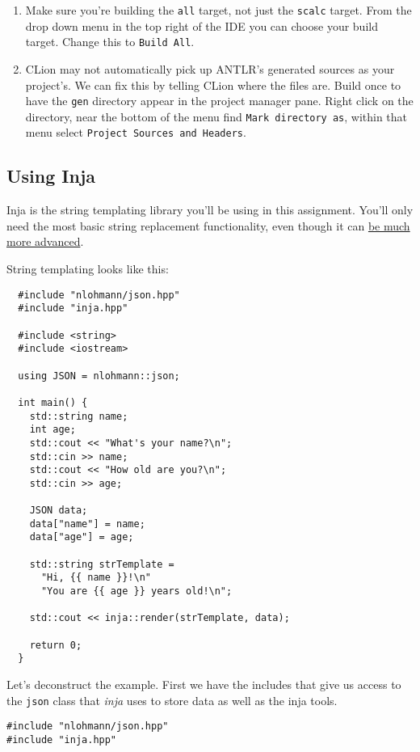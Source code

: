 \documentclass{article}
\newcommand{\code}[1]{\texttt{\textmd{#1}}}
\begin{document}
\begin{enumerate}
\begin{enumerate}
    \end{enumerate}
  \item
    Make sure you're building the \texttt{all} target, not just the \texttt{scalc} target. From the
    drop down menu in the top right of the IDE you can choose your build target. Change this to
    \texttt{Build All}.
  \item
    CLion may not automatically pick up ANTLR's generated sources as your project's. We can fix
    this by telling CLion where the files are. Build once to have the \code{gen} directory appear
    in the project manager pane. Right click on the directory, near the bottom of the menu find
    \texttt{Mark directory as}, within that menu select \texttt{Project Sources and Headers}.
\end{enumerate}

\subsection{Using Inja}
Inja is the string templating library you'll be using in this assignment. You'll only need the most
basic string replacement functionality, even though it can
\href{https://github.com/pantor/inja\#tutorial}{be much more advanced}.

String templating looks like this:
\begin{lstlisting}
  #include "nlohmann/json.hpp"
  #include "inja.hpp"

  #include <string>
  #include <iostream>

  using JSON = nlohmann::json;

  int main() {
    std::string name;
    int age;
    std::cout << "What's your name?\n";
    std::cin >> name;
    std::cout << "How old are you?\n";
    std::cin >> age;

    JSON data;
    data["name"] = name;
    data["age"] = age;

    std::string strTemplate =
      "Hi, {{ name }}!\n"
      "You are {{ age }} years old!\n";

    std::cout << inja::render(strTemplate, data);

    return 0;
  }
\end{lstlisting}

Let's deconstruct the example. First we have the includes that give us access to the \code{json}
class that \textit{inja} uses to store data as well as the inja tools.
\begin{lstlisting}
#include "nlohmann/json.hpp"
#include "inja.hpp"
\end{lstlisting}
\end{document}
